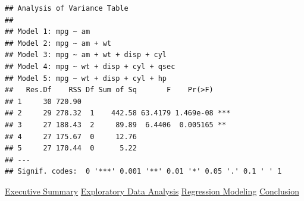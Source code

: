 \documentclass[10pt,]{article}
\begin{document}
\begin{verbatim}
## Analysis of Variance Table
## 
## Model 1: mpg ~ am
## Model 2: mpg ~ am + wt
## Model 3: mpg ~ am + wt + disp + cyl
## Model 4: mpg ~ wt + disp + cyl + qsec
## Model 5: mpg ~ wt + disp + cyl + hp
##   Res.Df    RSS Df Sum of Sq       F    Pr(>F)    
## 1     30 720.90                                   
## 2     29 278.32  1    442.58 63.4179 1.469e-08 ***
## 3     27 188.43  2     89.89  6.4406  0.005165 ** 
## 4     27 175.67  0     12.76                      
## 5     27 170.44  0      5.22                      
## ---
## Signif. codes:  0 '***' 0.001 '**' 0.01 '*' 0.05 '.' 0.1 ' ' 1
\end{verbatim}

\hyperref[eo]{Executive Summary} \textbar{} \hyperref[eda]{Exploratory
Data Analysis} \textbar{} \hyperref[rm]{Regression Modeling} \textbar{}
\hyperref[conclusion]{Conclusion}
\end{document}
